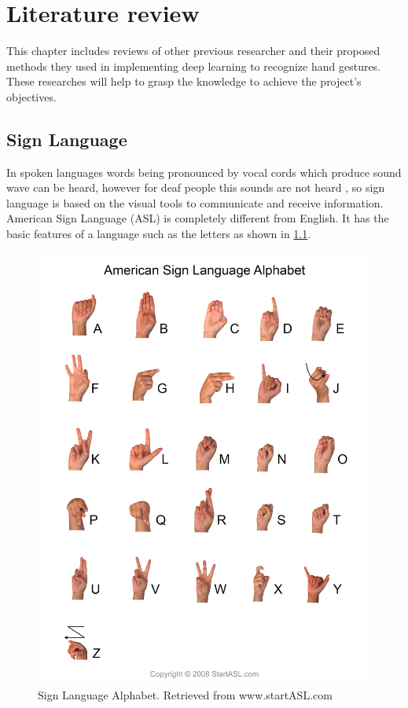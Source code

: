 \documentclass[12pt]{report}
\begin{document}
\chapter{Literature review}

This chapter includes reviews of other previous researcher
and their proposed methods they used in implementing deep learning
to recognize hand gestures. These researches will help to grasp the knowledge
to achieve the project's objectives. 
\section{Sign Language}
In spoken languages words being pronounced by vocal cords which produce sound
wave can be heard, however for deaf people this sounds are not heard \cite{Ishizaka1972}, 
so sign language is based on the visual tools to communicate and receive 
information.
American Sign Language (ASL) is completely different from English. It has 
the basic features of a language such as the letters as shown in \ref{fig:sign_language}.

\begin{figure}
    \centering
    \includegraphics[width=\textwidth]{./images/sign_language.png}
    \caption{Sign Language Alphabet. Retrieved from www.startASL.com}
    \label{fig:sign_language}
\end{figure}
\end{document}
